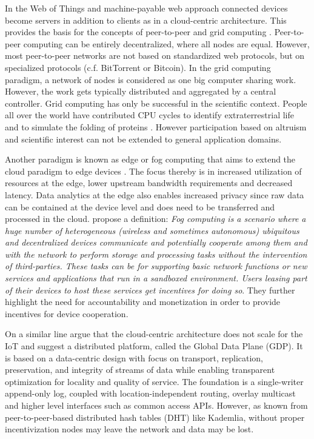 In the Web of Things and machine-payable web approach connected devices become servers in addition to clients as in a cloud-centric architecture. This provides the basis for the concepts of peer-to-peer \parencite{Rodrigues:2010:PS:1831407.1831427}and grid computing \parencite{Anderson2004boinc}. Peer-to-peer computing can be entirely decentralized, where all nodes are equal. However, most peer-to-peer networks are not based on standardized web protocols, but on specialized protocols (c.f. BitTorrent or Bitcoin). In the grid computing paradigm, a network of nodes is considered as one big computer sharing work. However, the work gets typically distributed and aggregated by a central controller. Grid computing has only be successful in the scientific context. People all over the world have contributed CPU cycles to identify extraterrestrial life \parencite{Anderson:2002:SEP:581571.581573} and to simulate the folding of proteins \parencite{Beberg2009Folding}. However participation based on altruism and scientific interest can not be extended to general application domains.   

Another paradigm is known as edge or fog computing that aims to extend the cloud paradigm to edge devices \parencite{Bonomi:2012:FCR:2342509.2342513,ISI:000343986300007,Yi:2015:SFC:2757384.2757397}. The focus thereby is in increased utilization of resources at the edge, lower upstream bandwidth requirements and decreased latency. Data analytics at the edge also enables increased privacy since raw data can be contained at the device level and does need to be transferred and processed in the cloud. \cite{ISI:000343986300007} propose a definition: \emph{Fog computing is a scenario where a huge number of heterogeneous (wireless and sometimes autonomous) ubiquitous and decentralized devices communicate and potentially cooperate among them and with the network to perform storage and processing tasks without the intervention of third-parties. These tasks can be for supporting basic network functions or new services and applications that run in a sandboxed environment. Users leasing part of their devices to host these services get incentives for doing so}. They further highlight the need for accountability and monetization in order to provide incentives for device cooperation. 

On a similar line \cite{Zhang:2015} argue that the cloud-centric architecture does not scale for the IoT and suggest a distributed platform, called the Global Data Plane (GDP). It is based on a data-centric design with focus on transport, replication, preservation, and integrity of streams of data while enabling transparent optimization for locality and quality of service. The foundation is a single-writer append-only log, coupled with location-independent routing, overlay multicast and higher level interfaces such as common access APIs. However, as known from peer-to-peer-based distributed hash tables (DHT) like Kademlia, without proper incentivization nodes may leave the network and data may be lost. 

